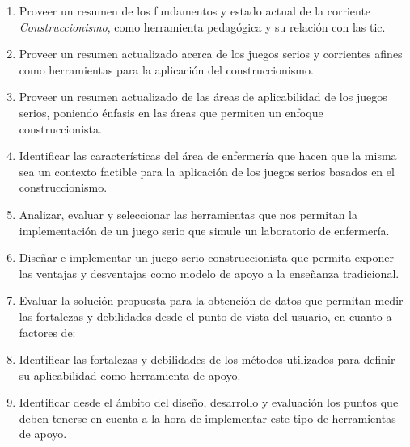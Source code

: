 \begin{enumerate}
    \item Proveer un resumen de los fundamentos y estado actual de la corriente
        \emph{Construccionismo}, como herramienta pedagógica y su relación con
        las \gls{tic}.

    \item Proveer un resumen actualizado acerca de los juegos serios y
        corrientes afines como herramientas para la aplicación del
        construccionismo.
    
    \item Proveer un resumen actualizado de las áreas de aplicabilidad de los
        juegos serios, poniendo énfasis en las áreas que permiten un enfoque
        construccionista.
        
    \item Identificar las características del área de enfermería que hacen que
        la misma sea un contexto factible para la aplicación de los juegos
        serios basados en el construccionismo.
    
    \item Analizar, evaluar y seleccionar las herramientas que nos permitan la
        implementación de un juego serio que simule un laboratorio de
        enfermería.
        
    \item Diseñar e implementar un juego serio construccionista que permita
        exponer las ventajas y desventajas como modelo de apoyo a la enseñanza
        tradicional. 

    \item Evaluar la solución propuesta para la obtención de datos que permitan
        medir las fortalezas y debilidades desde el punto de vista del usuario,
        en cuanto a factores de:

    \item Identificar las fortalezas y debilidades de los métodos utilizados
        para definir su aplicabilidad como herramienta de apoyo. 

    \item Identificar desde el ámbito del diseño, desarrollo y evaluación los puntos que deben
        tenerse en cuenta a la hora de implementar este tipo de herramientas de
        apoyo.
\end{enumerate}
